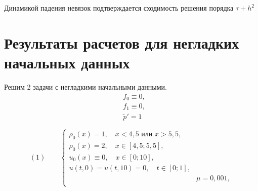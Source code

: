 \documentclass[a4paper, 11pt]{article}
\begin{document}
Динамикой падения невязок подтверждается сходимость решения порядка $\tau + h^2$
\enlargethispage{7\baselineskip}\\

\section{Результаты расчетов для негладких начальных данных}
Решим 2 задачи с негладкими начальными данными.
\begin{equation}
\begin{split}
& f_0 \equiv  0, \\
& f_1  \equiv 0, \\
& \tilde{p}' = 1
\end{split}
\end{equation}

$$
(1)\quad \quad
\begin{cases}
\rho_0(x) = 1, \quad x < 4,5 \text{ или } x > 5,5,\\
\rho_0(x) = 2, \quad x \in [4,5; 5,5],\\
u_0(x) \equiv 0, \quad x \in [0; 10],\\
u(t, 0) = u(t, 10) = 0, \quad t \in [0; 1], \\
& \mu =  0,001, \\
\end{cases}
$$
\end{document}

